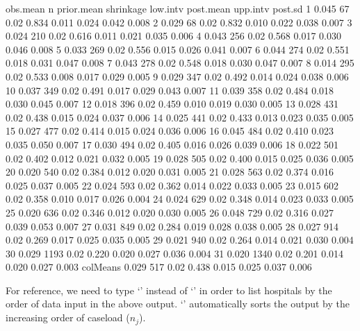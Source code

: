 \documentclass[article]{jss}
\begin{document}
\begin{CodeChunk}
\begin{CodeOutput}
         obs.mean    n prior.mean shrinkage low.intv post.mean upp.intv post.sd
1           0.045   67       0.02     0.834    0.011     0.024    0.042   0.008
2           0.029   68       0.02     0.832    0.010     0.022    0.038   0.007
3           0.024  210       0.02     0.616    0.011     0.021    0.035   0.006
4           0.043  256       0.02     0.568    0.017     0.030    0.046   0.008
5           0.033  269       0.02     0.556    0.015     0.026    0.041   0.007
6           0.044  274       0.02     0.551    0.018     0.031    0.047   0.008
7           0.043  278       0.02     0.548    0.018     0.030    0.047   0.007
8           0.014  295       0.02     0.533    0.008     0.017    0.029   0.005
9           0.029  347       0.02     0.492    0.014     0.024    0.038   0.006
10          0.037  349       0.02     0.491    0.017     0.029    0.043   0.007
11          0.039  358       0.02     0.484    0.018     0.030    0.045   0.007
12          0.018  396       0.02     0.459    0.010     0.019    0.030   0.005
13          0.028  431       0.02     0.438    0.015     0.024    0.037   0.006
14          0.025  441       0.02     0.433    0.013     0.023    0.035   0.005
15          0.027  477       0.02     0.414    0.015     0.024    0.036   0.006
16          0.045  484       0.02     0.410    0.023     0.035    0.050   0.007
17          0.030  494       0.02     0.405    0.016     0.026    0.039   0.006
18          0.022  501       0.02     0.402    0.012     0.021    0.032   0.005
19          0.028  505       0.02     0.400    0.015     0.025    0.036   0.005
20          0.020  540       0.02     0.384    0.012     0.020    0.031   0.005
21          0.028  563       0.02     0.374    0.016     0.025    0.037   0.005
22          0.024  593       0.02     0.362    0.014     0.022    0.033   0.005
23          0.015  602       0.02     0.358    0.010     0.017    0.026   0.004
24          0.024  629       0.02     0.348    0.014     0.023    0.033   0.005
25          0.020  636       0.02     0.346    0.012     0.020    0.030   0.005
26          0.048  729       0.02     0.316    0.027     0.039    0.053   0.007
27          0.031  849       0.02     0.284    0.019     0.028    0.038   0.005
28          0.027  914       0.02     0.269    0.017     0.025    0.035   0.005
29          0.021  940       0.02     0.264    0.014     0.021    0.030   0.004
30          0.029 1193       0.02     0.220    0.020     0.027    0.036   0.004
31          0.020 1340       0.02     0.201    0.014     0.020    0.027   0.003
colMeans    0.029  517       0.02     0.438    0.015     0.025    0.037   0.006
\end{CodeOutput}
\end{CodeChunk}
For reference, we need to type `' instead of `' in order to list hospitals by the order of data input in the above output. `' automatically sorts the output by the increasing order of caseload ($n_{j}$). 
\end{document}
